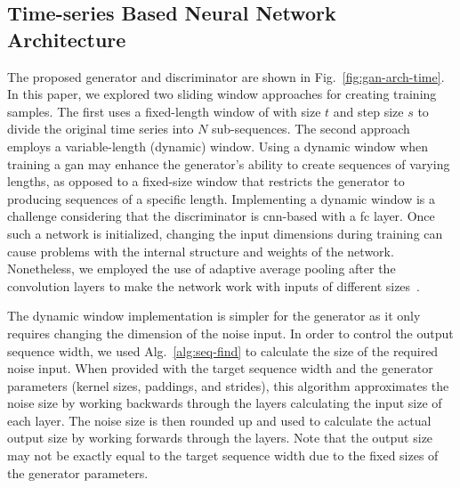 %



\subsection{Time-series Based Neural Network Architecture}
The proposed generator and discriminator are shown in Fig.~\ref{fig:gan-arch-time}. In this paper, we explored two sliding window approaches for creating training samples. The first uses a fixed-length window of with size $t$ and step size $s$ to divide the
original time series into $N$ sub-sequences. The second approach employs a variable-length (dynamic) window. Using a dynamic window when training a \gls*{gan} may enhance the generator's ability to create sequences of varying lengths, as opposed to a fixed-size window that restricts the generator to producing sequences of a specific length.
%
Implementing a dynamic window is a challenge considering that the discriminator is \gls*{cnn}-based with a \gls*{fc} layer. Once such a network is initialized, changing the input dimensions during training can cause problems with the internal structure and weights of the network. Nonetheless, we employed the use of adaptive average pooling after the convolution layers to make the network work with inputs of different sizes~\cite{he_spatial_2014}. 

The dynamic window implementation is simpler for the generator as it only requires changing the dimension of the noise input.  In order to control the output sequence width, we used Alg.~\ref{alg:seq-find} to calculate the size of the required noise input. When provided with the target sequence width and the generator parameters (kernel sizes, paddings, and strides), this algorithm approximates the noise size by working backwards through the layers calculating the input size of each layer. The noise size is then rounded up and used to calculate the actual output size by working forwards through the layers. Note that the output size may not be exactly equal to the target sequence width due to the fixed sizes of the generator parameters. 



